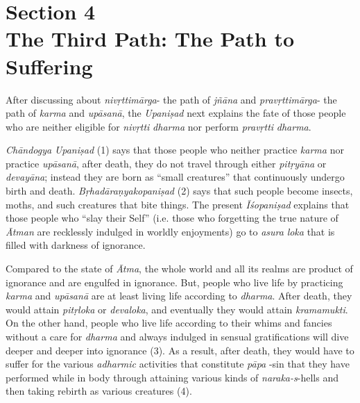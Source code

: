 \chapter{Section 4\\ The Third Path: The Path to Suffering}

After discussing about \emph{nivṛttimārga}- the path of \emph{jñāna} and \emph{pravṛttimārga}- the path of \emph{karma} and \emph{upāsanā}, the \emph{Upaniṣad} next explains the fate of those people who are neither eligible for \emph{nivṛtti} \emph{dharma} nor perform \emph{pravṛtti} \emph{dharma}.

\emph{Chāndogya} \emph{Upaniṣad} (1) says that those people who neither practice \emph{karma} nor practice \emph{upāsanā}, after death, they do not travel through either \emph{pitṛyāna} or \emph{devayāna}; instead they are born as ``small creatures'' that continuously undergo birth and death. \emph{Bṛhadāraṇyakopaniṣad} (2) says that such people become insects, moths, and such creatures that bite things. The present \emph{Īśopaniṣad} explains that those people who ``slay their Self'' (i.e. those who forgetting the true nature of \emph{Ātman} are recklessly indulged in worldly enjoyments) go to \emph{asura} \emph{loka} that is filled with darkness of ignorance.

Compared to the state of \emph{Ātma}, the whole world and all its realms are product of ignorance and are engulfed in ignorance. But, people who live life by practicing \emph{karma} and \emph{upāsanā} are at least living life according to \emph{dharma}. After death, they would attain \emph{pitṛloka} or \emph{devaloka}, and eventually they would attain \emph{kramamukti}. On the other hand, people who live life according to their whims and fancies without a care for \emph{dharma} and always indulged in sensual gratifications will dive deeper and deeper into ignorance (3). As a result, after death, they would have to suffer for the various \emph{adharmic} activities that constitute \emph{pāpa} -sin that they have performed while in body through attaining various kinds of \emph{naraka-s}-hells and then taking rebirth as various creatures (4).

